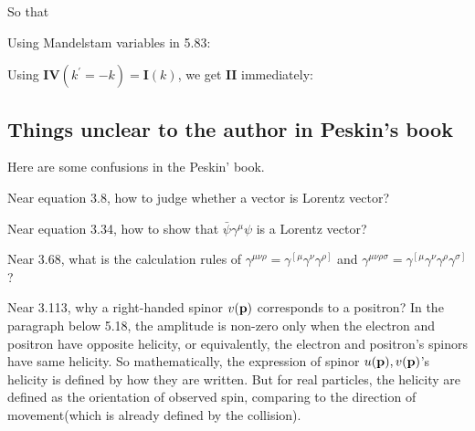 So that


Using Mandelstam variables in 5.83:



Using $\mathbf{IV}(k^\prime = -k) = \mathbf{I}(k)$, we get $\mathbf{II}$ immediately:


\subsection{Things unclear to the author in Peskin's book}

Here are some confusions in the Peskin' book.

Near equation 3.8, how to judge whether a vector is Lorentz vector?

Near equation 3.34, how to show that $\bar{\psi}\gamma^\mu\psi$ is a Lorentz vector?

Near 3.68, what is the calculation rules of $\gamma^{\mu\nu\rho}=\gamma^{\left[\mu\right.}\gamma^\nu\gamma^{\left.\rho\right]}$ and $\gamma^{\mu\nu\rho\sigma}=\gamma^{\left[\mu\right.}\gamma^\nu\gamma^\rho\gamma^{\left.\sigma\right]}$?

Near 3.113, why a right-handed spinor $v(\bf{p})$ corresponds to a positron?
In the paragraph below 5.18, the amplitude is non-zero only when the electron and positron have opposite helicity,
or equivalently, the electron and positron's spinors have same helicity.
So mathematically, the expression of spinor $u(\bf{p}),v(\bf{p})$'s helicity is defined by how they are written.
But for real particles, the helicity are defined as the orientation of observed spin, comparing to the direction of movement(which is already defined by the collision).

\clearpage
